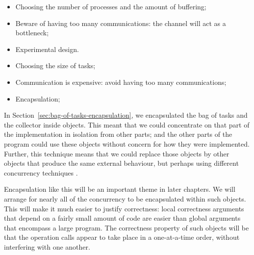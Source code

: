 \begin{itemize}




\item
Choosing the number of processes and the amount of buffering;

\item
Beware of having too many communications: the channel will act as a bottleneck;

\item
Experimental design.


\item
Choosing the size of tasks;

\item
Communication is expensive: avoid having too many communications;

\item
Encapsulation;

\end{itemize}

In Section~\ref{sec:bag-of-tasks-encapsulation}, we encapsulated the bag of
tasks and the collector inside objects.  This meant that we could concentrate
on that part of the implementation in isolation from other parts; and the
other parts of the program could use these objects without concern for how
they were implemented.  Further, this technique means that we could replace
those objects by other objects that produce the same external behaviour, but
perhaps using different concurrency techniques .

Encapsulation like this will be an important theme in later chapters.  We will
arrange for nearly all of the concurrency to be encapsulated within such
objects.  This will make it much easier to justify correctness: local
correctness arguments that depend on a fairly small amount of code are easier
than global arguments that encompass a large program.  The correctness
property of such objects will be that the operation calls appear to take place
in a one-at-a-time order, without interfering with one another.

